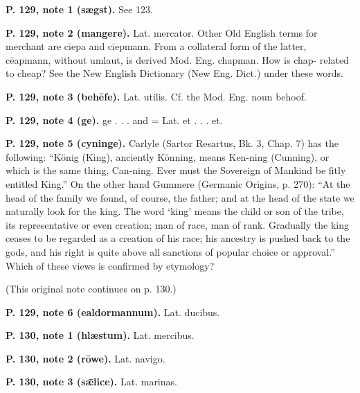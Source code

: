 \textbf{P. 129, note 1 (sægst).} See 123.

\textbf{P. 129, note 2 (mangere).} Lat. mercator. Other Old English terms for merchant are cīepa and cīepmann. From a collateral form of the latter, cēapmann, without umlaut, is derived Mod. Eng. chapman. How is chap- related to cheap? See the New English Dictionary (New Eng. Dict.) under these words.

\textbf{P. 129, note 3 (behēfe).} Lat. utilis. Cf. the Mod. Eng. noun behoof.

\textbf{P. 129, note 4 (ge).} ge . . . and = Lat. et . . . et.

\textbf{P. 129, note 5 (cyninge).} Carlyle (Sartor Resartus, Bk. 3, Chap. 7) has the following: “König (King), anciently Könning, means Ken-ning (Cunning), or which is the same thing, Can-ning. Ever must the Sovereign of Mankind be fitly entitled King.” On the other hand Gummere (Germanic Origins, p. 270): “At the head of the family we found, of course, the father; and at the head of the state we naturally look for the king. The word ‘king’ means the child or son of the tribe, its representative or even creation; man of race, man of rank. Gradually the king ceases to be regarded as a creation of his race; his ancestry is pushed back to the gods, and his right is quite above all sanctions of popular choice or approval.” Which of these views is confirmed by etymology?

(This original note continues on p. 130.)

\textbf{P. 129, note 6 (ealdormannum).} Lat. ducibus.

\textbf{P. 130, note 1 (hlæstum).} Lat. mercibus.

\textbf{P. 130, note 2 (rōwe).} Lat. navigo.

\textbf{P. 130, note 3 (sǣlice).} Lat. marinas.

